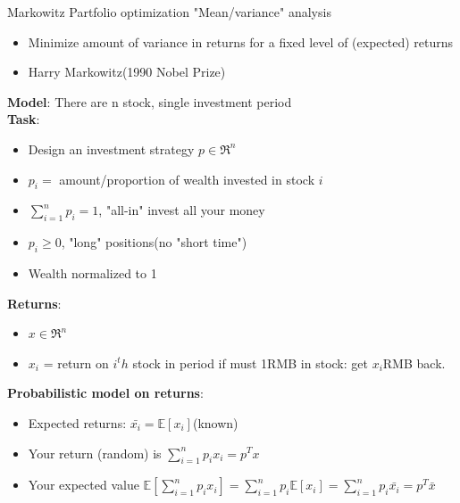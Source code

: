 \begin{example}{Markowitz Partfolio optimization}
	"Mean/variance" analysis
	
	\begin{itemize}
		\item Minimize amount of variance in returns for a fixed level of (expected) returns
		
		\item Harry Markowitz(1990 Nobel Prize)
	\end{itemize}
	
	\textbf{Model}: There are n stock, single investment period\\
	
	\textbf{Task}:
	
	\begin{itemize}
		\item Design an investment strategy $p\in \Re^n$
		
		\item $p_i = $ amount/proportion of wealth invested in stock $i$
		
		\item $\sum^n_{i=1}p_i = 1$, "all-in" invest all your money
		
		\item $p_i \geq 0$, "long" positions(no "short time")
		
		\item Wealth normalized to 1
	\end{itemize} 
	
	\textbf{Returns}:
	
	\begin{itemize}
		\item $x\in \Re^n$
		
		\item $x_i$ = return on $i^th$ stock in period if must 1RMB in stock: get $x_i$RMB back.
	\end{itemize} 
	
	
	\textbf{Probabilistic model on returns}:
	
	\begin{itemize}
		\item Expected returns: $\bar{x_i} = \mathbb{E}[x_i]$(known)
		
		\item Your return (random) is $\sum^n_{i=1}p_ix_i = p^Tx$
		
		\item Your expected value $\mathbb{E}[\sum^n_{i=1}p_ix_i] = \sum^n_{i=1}p_i\mathbb{E}[x_i] = \sum^n_{i=1}p_i\bar{x_i} = p^T\bar{x}$
		

\end{itemize}
\end{example}
